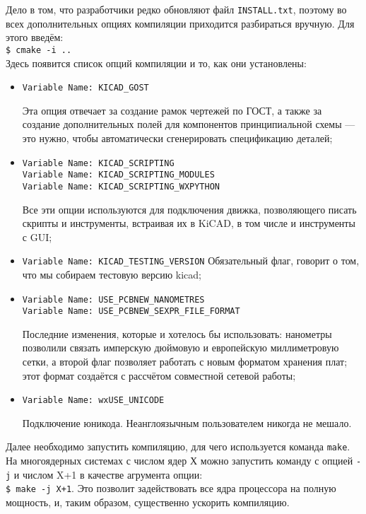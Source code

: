 Дело в том, что разработчики редко обновляют файл \texttt{INSTALL.txt}, поэтому во всех дополнительных опциях компиляции приходится разбираться вручную.
Для этого введём:\\
\texttt{\$ cmake -i ..}\\
Здесь появится список опций компиляции и то, как они установлены:
\begin{itemize}
 \item \texttt{Variable Name: KICAD\_GOST}

       Эта опция отвечает за создание рамок чертежей по ГОСТ, а также за создание дополнительных полей для компонентов принципиальной схемы --- это нужно, чтобы автоматически сгенерировать спецификацию деталей;
 \item \texttt{Variable Name: KICAD\_SCRIPTING}\\
       \texttt{Variable Name: KICAD\_SCRIPTING\_MODULES}\\
       \texttt{Variable Name: KICAD\_SCRIPTING\_WXPYTHON}

       Все эти опции используются для подключения движка, позволяющего писать скрипты и инструменты, встраивая их в KiCAD, в том числе и инструменты с GUI;
 \item \texttt{Variable Name: KICAD\_TESTING\_VERSION}
       Обязательный флаг, говорит о том, что мы собираем тестовую версию kicad;
 \item \texttt{Variable Name: USE\_PCBNEW\_NANOMETRES}\\
       \texttt{Variable Name: USE\_PCBNEW\_SEXPR\_FILE\_FORMAT}

       Последние изменения, которые и хотелось бы использовать:
       нанометры позволили связать имперскую дюймовую и европейскую миллиметровую сетки,
       а второй флаг позволяет работать с новым форматом хранения плат;
       этот формат создаётся с рассчётом совместной сетевой работы;
 \item \texttt{Variable Name: wxUSE\_UNICODE}

       Подключение юникода. Неанглоязычным пользователем никогда не мешало.
\end{itemize}

Далее необходимо запустить компиляцию, для чего используется команда \texttt{make}.
На многоядерных системах с числом ядер Х можно запустить команду с опцией \texttt{-j} и числом X+1 в качестве агрумента опции:\\
\texttt{\$ make -j X+1}.
Это позволит задействовать все ядра процессора на полную мощность, и, таким образом, существенно ускорить компиляцию.


